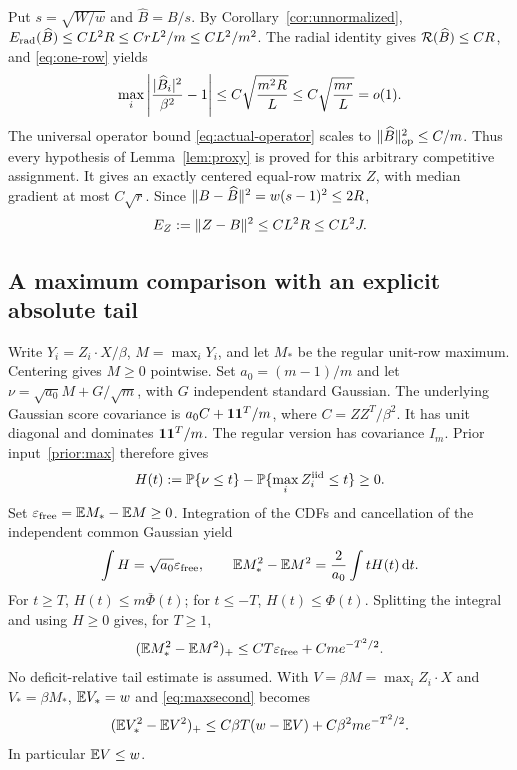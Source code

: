 Put $s=\sqrt{W/w}$ and $\widehat B=B/s$. By
Corollary~\ref{cor:unnormalized},
$E_{\rm rad}(\widehat B)\le CL^2R\le CrL^2/m\le CL^2/m^2$.
The radial identity gives $\mathcal R(\widehat B)\le CR$, and
\eqref{eq:one-row} yields
\[
 \max_i\left|\frac{\lvert \widehat B_i\rvert^2}{\beta^2}-1\right|
           \le C\sqrt{\frac{m^2R}{L}}
           \le C\sqrt{\frac{mr}{L}}=o(1).
\]
The universal operator bound \eqref{eq:actual-operator} scales to
$\lVert \widehat B\rVert_{\rm op}^2\le C/m$. Thus every hypothesis of
Lemma~\ref{lem:proxy} is proved for this arbitrary competitive assignment.
It gives an exactly centered equal-row matrix $Z$, with median gradient
at most $C\sqrt r$.
Since $\lVert B-\widehat B\rVert^2=w(s-1)^2\le2R$,
\begin{equation}\label{eq:proxyerror}
              E_Z:=\lVert Z-B\rVert^2\le CL^2R\le CL^2J.
\end{equation}

\subsection{A maximum comparison with an explicit absolute tail}
Write $Y_i=Z_i\cdot X/\beta$, $M=\max_iY_i$, and let $M_*$ be the
regular unit-row maximum. Centering gives $M\ge0$ pointwise.
Set $a_0=(m-1)/m$ and let
$\nu=\sqrt{a_0}M+G/\sqrt m$, with $G$ independent standard Gaussian.
The underlying Gaussian score covariance is
$a_0C+\mathbf 1\mathbf 1^T/m$, where $C=ZZ^T/\beta^2$.
It has unit diagonal and dominates $\mathbf 1\mathbf 1^T/m$. The regular version
has covariance $I_m$. Prior input~\ref{prior:max} therefore gives
\[
 H(t):=\mathbb P\{\nu\le t\}-\mathbb P\{\max_iZ_i^{\rm iid}\le t\}\ge0.
\]
Set $\varepsilon_{\rm free}=\mathbb E M_*-\mathbb E M\ge0$. Integration of the CDFs
and cancellation of the independent common Gaussian yield
\[
 \int H=\sqrt{a_0}\varepsilon_{\rm free},\qquad
 \mathbb E M_*^2-\mathbb E M^2=\frac2{a_0}\int tH(t)\,\mathrm d t.
\]
For $t\ge T$, $H(t)\le m\overline\Phi(t)$; for $t\le-T$,
$H(t)\le\Phi(t)$. Splitting the integral and using $H\ge0$ gives,
for $T\ge1$,
\begin{equation}\label{eq:maxsecond}
       (\mathbb E M_*^2-\mathbb E M^2)_+
           \le CT\varepsilon_{\rm free}+Cm e^{-T^2/2}.
\end{equation}
No deficit-relative tail estimate is assumed.
With $V=\beta M=\max_i Z_i\cdot X$ and $V_*=\beta M_*$,
$\mathbb E V_*=w$ and \eqref{eq:maxsecond} becomes
\begin{equation}\label{eq:scaledmax}
 (\mathbb E V_*^2-\mathbb E V^2)_+
       \le C\beta T(w-\mathbb E V)+C\beta^2m e^{-T^2/2}.
\end{equation}
In particular $\mathbb E V\le w$.

